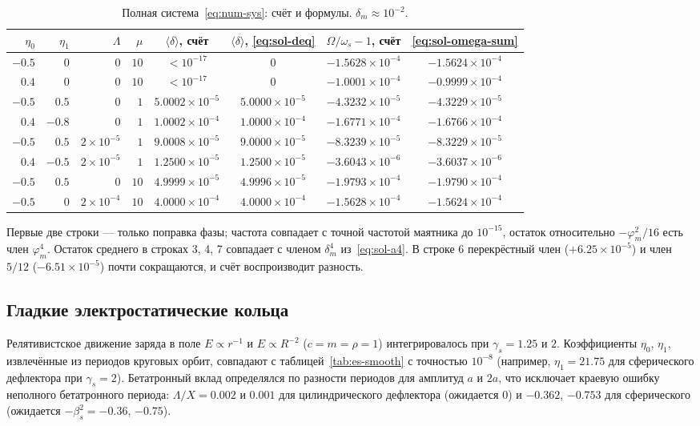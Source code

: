 \begin{table}[htb]
\caption{Полная система~\eqref{eq:num-sys}: счёт и формулы. $\delta_m\approx10^{-2}$.}
\label{tab:num-sol}
\small
\begin{ruledtabular}
\begin{tabular}{rrrrcccc}
$\eta_0$ & $\eta_1$ & $\Lambda$ & $\mu$ & $\langle\delta\rangle$, счёт & $\langle\delta\rangle$, \eqref{eq:sol-deq} & $\Omega/\omega_s-1$, счёт & \eqref{eq:sol-omega-sum} \\
\hline
$-0.5$ & $0$ & $0$ & $10$ & $<10^{-17}$ & $0$ & $-1.5628\times10^{-4}$ & $-1.5624\times10^{-4}$ \\
$0.4$ & $0$ & $0$ & $10$ & $<10^{-17}$ & $0$ & $-1.0001\times10^{-4}$ & $-0.9999\times10^{-4}$ \\
$-0.5$ & $0.5$ & $0$ & $1$ & $5.0002\times10^{-5}$ & $5.0000\times10^{-5}$ & $-4.3232\times10^{-5}$ & $-4.3229\times10^{-5}$ \\
$0.4$ & $-0.8$ & $0$ & $1$ & $1.0002\times10^{-4}$ & $1.0000\times10^{-4}$ & $-1.6771\times10^{-4}$ & $-1.6766\times10^{-4}$ \\
$-0.5$ & $0.5$ & $2\times10^{-5}$ & $1$ & $9.0008\times10^{-5}$ & $9.0000\times10^{-5}$ & $-8.3239\times10^{-5}$ & $-8.3229\times10^{-5}$ \\
$0.4$ & $-0.5$ & $2\times10^{-5}$ & $1$ & $1.2500\times10^{-5}$ & $1.2500\times10^{-5}$ & $-3.6043\times10^{-6}$ & $-3.6037\times10^{-6}$ \\
$-0.5$ & $0.5$ & $0$ & $10$ & $4.9999\times10^{-5}$ & $4.9996\times10^{-5}$ & $-1.9793\times10^{-4}$ & $-1.9790\times10^{-4}$ \\
$-0.5$ & $0$ & $2\times10^{-4}$ & $10$ & $4.0000\times10^{-4}$ & $4.0000\times10^{-4}$ & $-1.5628\times10^{-4}$ & $-1.5624\times10^{-4}$ \\
\end{tabular}
\end{ruledtabular}
\end{table}

Первые две строки --- только поправка фазы; частота совпадает с точной частотой маятника до $10^{-15}$, остаток относительно $-\varphi_m^2/16$ есть член $\varphi_m^4$. Остаток среднего в строках 3, 4, 7 совпадает с членом $\delta_m^4$ из~\eqref{eq:sol-a4}. В строке 6 перекрёстный член ($+6.25\times10^{-5}$) и член $5/12$ ($-6.51\times10^{-5}$) почти сокращаются, и счёт воспроизводит разность.

\subsection{Гладкие электростатические кольца}

Релятивистское движение заряда в поле $E\propto r^{-1}$ и $E\propto R^{-2}$ ($c=m=\rho=1$) интегрировалось при $\gamma_s=1.25$ и $2$. Коэффициенты $\eta_0$, $\eta_1$, извлечённые из периодов круговых орбит, совпадают с таблицей~\ref{tab:es-smooth} с точностью $10^{-8}$ (например, $\eta_1=21.75$ для сферического дефлектора при $\gamma_s=2$). Бетатронный вклад определялся по разности периодов для амплитуд $a$ и $2a$, что исключает краевую ошибку неполного бетатронного периода: $\Lambda/X=0.002$ и $0.001$ для цилиндрического дефлектора (ожидается $0$) и $-0.362$, $-0.753$ для сферического (ожидается $-\beta_s^2=-0.36$, $-0.75$).
